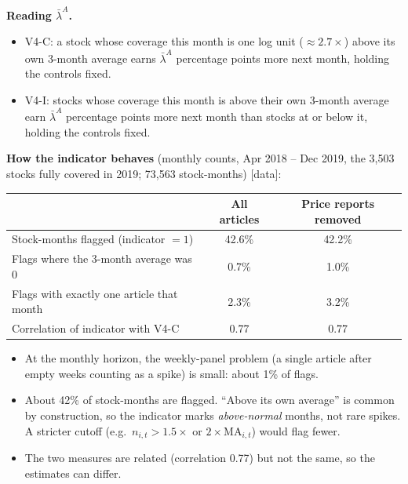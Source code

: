 \documentclass[11pt]{article}
\newcommand{\data}{\textcolor{NavyBlue}{\textsf{[data]}}}
\begin{document}
\textbf{Reading $\bar\lambda^A$.}
\begin{itemize}
  \item V4-C: a stock whose coverage this month is one log unit ($\approx 2.7\times$) above its own 3-month average earns $\bar\lambda^A$ percentage points more next month, holding the controls fixed.
  \item V4-I: stocks whose coverage this month is above their own 3-month average earn $\bar\lambda^A$ percentage points more next month than stocks at or below it, holding the controls fixed.
\end{itemize}

\textbf{How the indicator behaves} (monthly counts, Apr 2018 -- Dec 2019, the 3{,}503 stocks fully covered in 2019; 73{,}563 stock-months) \data{}:
\begin{center}\small
\begin{tabular}{lcc}
\toprule
 & All articles & Price reports removed\\
\midrule
Stock-months flagged (indicator $=1$) & 42.6\% & 42.2\%\\
Flags where the 3-month average was 0 & 0.7\% & 1.0\%\\
Flags with exactly one article that month & 2.3\% & 3.2\%\\
Correlation of indicator with V4-C & 0.77 & 0.77\\
\bottomrule
\end{tabular}
\end{center}
\begin{itemize}
  \item At the monthly horizon, the weekly-panel problem (a single article after empty weeks counting as a spike) is small: about 1\% of flags.
  \item About 42\% of stock-months are flagged. ``Above its own average'' is common by construction, so the indicator marks \emph{above-normal} months, not rare spikes. A stricter cutoff (e.g.\ $n_{i,t} > 1.5\times$ or $2\times\text{MA}_{i,t}$) would flag fewer.
  \item The two measures are related (correlation 0.77) but not the same, so the estimates can differ.
\end{itemize}
\end{document}
